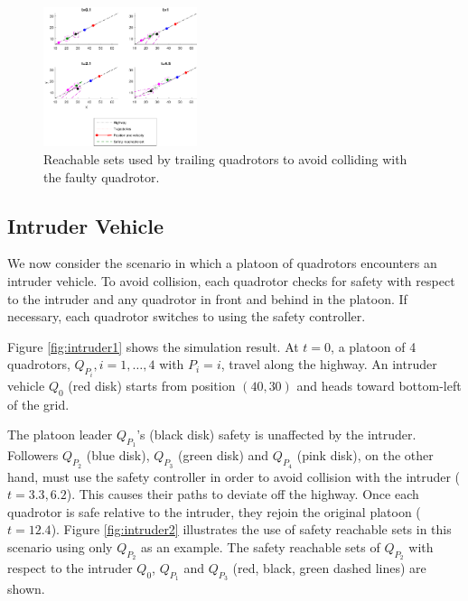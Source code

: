 \begin{figure}
	\center
		\includegraphics[width=0.4\textwidth]{fig/faultyRsets}
		\caption{Reachable sets used by trailing quadrotors to avoid colliding with the faulty quadrotor.}
		\label{fig:faulty2}
\end{figure}

\subsection{Intruder Vehicle}
We now consider the scenario in which a platoon of quadrotors encounters an intruder vehicle. To avoid collision, each quadrotor checks for safety with respect to the intruder and any quadrotor in front and behind in the platoon. If necessary, each quadrotor switches to using the safety controller.

Figure \ref{fig:intruder1} shows the simulation result. At $t=0$, a platoon of 4 quadrotors, $Q_{P_i},i=1,\ldots,4$ with $P_i = i$, travel along the highway. An intruder vehicle $Q_0$ (red disk) starts from position $(40,30)$ and heads toward bottom-left of the grid. 

The platoon leader $Q_{P_1}$'s (black disk) safety is unaffected by the intruder. Followers $Q_{P_2}$ (blue disk), $Q_{P_3}$ (green disk) and $Q_{P_4}$ (pink disk), on the other hand, must use the safety controller in order to avoid collision with the intruder ($t=3.3,6.2$). This causes their paths to deviate off the highway. Once each quadrotor is safe relative to the intruder, they rejoin the original platoon ($t=12.4$). Figure \ref{fig:intruder2} illustrates the use of safety reachable sets in this scenario using only $Q_{P_2}$ as an example. The safety reachable sets of $Q_{P_2}$ with respect to the intruder $Q_0$, $Q_{P_1}$ and $Q_{P_3}$ (red, black, green dashed lines) are shown. %

